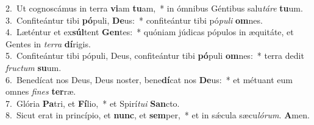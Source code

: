 {2.~}Ut cognoscámus in terra \textbf{vi}am \textbf{tu}am,~* in ómnibus Géntibus salu\textit{tá}\textit{re} \textbf{tu}um.\\
{3.~}Confiteántur tibi \textbf{pó}puli, \textbf{De}us:~* confiteántur tibi pó\textit{pu}\textit{li} \textbf{om}nes.\\
{4.~}Læténtur et ex\textbf{súl}tent \textbf{Gen}tes:~* quóniam júdicas pópulos in æquitáte, et Gentes in \textit{ter}\textit{ra} \textbf{dí}rigis.\\
{5.~}Confiteántur tibi pópuli, Deus, confiteántur tibi \textbf{pó}puli \textbf{om}nes:~* terra dedit \textit{fru}\textit{ctum} \textbf{su}um.\\
{6.~}Benedícat nos Deus, Deus noster, bene\textbf{dí}cat nos \textbf{De}us:~* et métuant eum omnes \textit{fi}\textit{nes} \textbf{ter}ræ.\\
{7.~}Glória \textbf{Pa}tri, et \textbf{Fí}lio,~* et Spirí\textit{tu}\textit{i} \textbf{San}cto.\\
{8.~}Sicut erat in princípio, et \textbf{nunc}, et \textbf{sem}per,~* et in sǽcula sæcu\textit{ló}\textit{rum}. \textbf{A}men.\\
